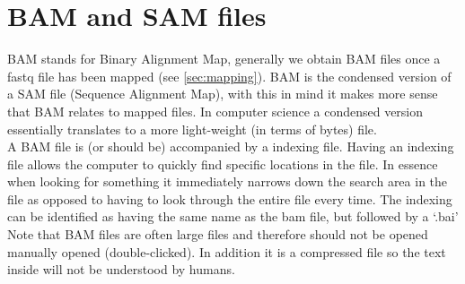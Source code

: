 \section{BAM and SAM files \label{sec:BAM_files}}
BAM stands for Binary Alignment Map, generally we obtain BAM files once a fastq file has been mapped (see \autoref{sec:mapping}). BAM is the condensed version of a SAM file (Sequence Alignment Map), with this in mind it makes more sense that BAM relates to mapped files. In computer science a condensed version essentially translates to a more light-weight (in terms of bytes) file.\\
A BAM file is (or should be) accompanied by a indexing file. Having an indexing file allows the computer to quickly find specific locations in the file. In essence when looking for something it immediately narrows down the search area in the file as opposed to having to look through the entire file every time. The indexing can be identified as having the same name as the bam file, but followed by a `.bai'\\
Note that BAM files are often large files and therefore should not be opened manually opened (double-clicked). In addition it is a compressed file so the text inside will not be understood by humans.